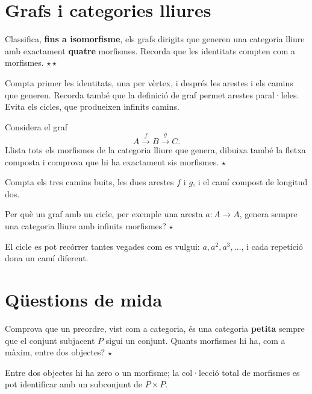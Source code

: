 \section{Grafs i categories lliures}

\begin{exercici}
Classifica, \textbf{fins a isomorfisme}, els grafs dirigits que generen una categoria lliure amb exactament \textbf{quatre} morfismes. Recorda que les identitats compten com a morfismes. \hfill{\normalfont$\star\star$}
\begin{indicacio}
Compta primer les identitats, una per vèrtex, i després les arestes i els camins que generen. Recorda també que la definició de graf permet arestes paral·leles. Evita els cicles, que produeixen infinits camins.
\end{indicacio}
\end{exercici}

\begin{exercici}
Considera el graf
\[
A\xrightarrow{f}B\xrightarrow{g}C.
\]
Llista tots els morfismes de la categoria lliure que genera, dibuixa també la fletxa composta i comprova que hi ha exactament sis morfismes. \hfill{\normalfont$\star$}
\begin{indicacio}
Compta els tres camins buits, les dues arestes $f$ i $g$, i el camí compost de longitud dos.
\end{indicacio}
\end{exercici}

\begin{exercici}
Per què un graf amb un cicle, per exemple una aresta $a\colon A\to A$, genera sempre una categoria lliure amb infinits morfismes? \hfill{\normalfont$\star$}
\begin{indicacio}
El cicle es pot recórrer tantes vegades com es vulgui: $a,a^2,a^3,\ldots$, i cada repetició dona un camí diferent.
\end{indicacio}
\end{exercici}

\section{Qüestions de mida}

\begin{exercici}
Comprova que un preordre, vist com a categoria, és una categoria \textbf{petita} sempre que el conjunt subjacent $P$ sigui un conjunt. Quants morfismes hi ha, com a màxim, entre dos objectes? \hfill{\normalfont$\star$}
\begin{indicacio}
Entre dos objectes hi ha zero o un morfisme; la col·lecció total de morfismes es pot identificar amb un subconjunt de $P\times P$.
\end{indicacio}
\end{exercici}

